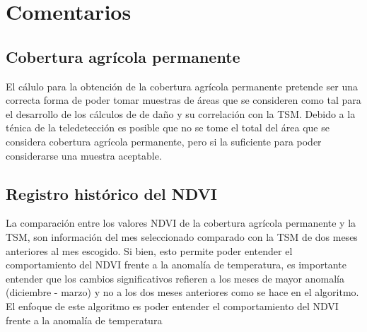 \section{Comentarios}

  \subsection{Cobertura agrícola permanente}
  
    El cálulo para la obtención de la cobertura agrícola permanente pretende ser una correcta forma de poder tomar muestras de áreas que se consideren como tal para el desarrollo de los cálculos de de daño y su correlación con la TSM. Debido a la ténica de la teledetección es posible que no se tome el total del área que se considera cobertura agrícola permanente, pero si la suficiente para poder considerarse una muestra aceptable.

  \subsection{Registro histórico del NDVI}

    La comparación entre los valores NDVI de la cobertura agrícola permanente y la TSM, son información del mes seleccionado comparado con la TSM de dos meses anteriores al mes escogido. Si bien, esto permite poder entender el comportamiento del NDVI frente a la anomalía de temperatura, es importante entender que los cambios significativos refieren a los meses de mayor anomalía (diciembre - marzo) y no a los dos meses anteriores como se hace en el algoritmo. El enfoque de este algoritmo es poder entender el comportamiento del NDVI frente a la anomalía de temperatura 